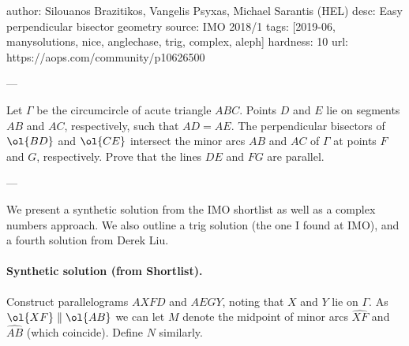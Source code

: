 author: Silouanos Brazitikos, Vangelis Psyxas, Michael Sarantis (HEL)
desc: Easy perpendicular bisector geometry
source: IMO 2018/1
tags: [2019-06, manysolutions, nice, anglechase, trig, complex, aleph]
hardness: 10
url: https://aops.com/community/p10626500

---

Let $\Gamma$ be the circumcircle of acute triangle $ABC$.
Points $D$ and $E$ lie on segments $AB$ and $AC$,
respectively, such that $AD = AE$.
The perpendicular bisectors of $\ol{BD}$ and $\ol{CE}$
intersect the minor arcs $AB$ and $AC$ of $\Gamma$
at points $F$ and $G$, respectively.
Prove that the lines $DE$ and $FG$ are parallel.

---

We present a synthetic solution from the IMO shortlist
as well as a complex numbers approach.
We also outline a trig solution (the one I found at IMO),
and a fourth solution from Derek Liu.


\paragraph{Synthetic solution (from Shortlist).}
Construct parallelograms $AXFD$ and $AEGY$,
noting that $X$ and $Y$ lie on $\Gamma$.
As $\ol{XF} \parallel \ol{AB}$ we can let $M$
denote the midpoint of minor arcs $\widehat{XF}$ and $\widehat{AB}$
(which coincide). Define $N$ similarly.

